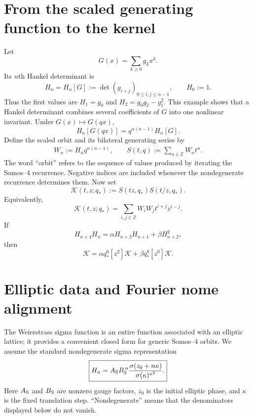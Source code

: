 \documentclass[11pt]{article}
\numberwithin{equation}{section}
\begin{document}
\section{From the scaled generating function to the kernel}
Let
\begin{equation}
G(x)=\sum_{k\ge0}g_kx^k.
\end{equation}
Its $n$th Hankel determinant is
\begin{equation}
H_n=H_n[G]:=\det(g_{i+j})_{0\le i,j\le n-1},\qquad H_0:=1.
\end{equation}
Thus the first values are $H_1=g_0$ and $H_2=g_0g_2-g_1^2$.  This example shows that a Hankel determinant combines several coefficients of $G$ into one nonlinear invariant. Under $G(x)\mapsto G(qx)$,
\begin{equation}
H_n[G(qx)]=q^{n(n-1)}H_n[G].
\end{equation}
Define the scaled orbit and its bilateral generating series by
\begin{equation}
\begin{aligned}
W_n:=H_nq^{n(n-1)},\qquad
S(t,q):=\sum_{n\in\mathbb Z}W_nt^n.
\end{aligned}
\end{equation}
The word ``orbit'' refers to the sequence of values produced by iterating the Somos--4 recurrence.  Negative indices are included whenever the nondegenerate recurrence determines them.  Now set
\begin{equation}
\boxed{\mathcal K(t,z;q_\ast):=S(tz,q_\ast)S(t/z,q_\ast).}
\end{equation}
Equivalently,
\begin{equation}
\mathcal K(t,z;q_\ast)=\sum_{i,j\in\mathbb Z}W_iW_jt^{i+j}z^{i-j}.
\end{equation}
If
\begin{equation}
H_{n+4}H_n=\alpha H_{n+3}H_{n+1}+\beta H_{n+2}^2,
\end{equation}
then
\begin{equation}
[z^4]\mathcal K=\alpha q_\ast^6[z^2]\mathcal K+\beta q_\ast^8[z^0]\mathcal K.
\end{equation}

\section{Elliptic data and Fourier nome alignment}
The Weierstrass sigma function is an entire function associated with an elliptic lattice; it provides a convenient closed form for generic Somos--4 orbits.  We assume the standard nondegenerate sigma representation
\begin{equation}
\boxed{H_n=A_{\rm S}B_{\rm S}^{\,n}
\frac{\sigma(z_0+n\kappa)}{\sigma(\kappa)^{n^2}}.}
\end{equation}
Here $A_{\rm S}$ and $B_{\rm S}$ are nonzero gauge factors, $z_0$ is the initial elliptic phase, and $\kappa$ is the fixed translation step.  ``Nondegenerate'' means that the denominators displayed below do not vanish.
\end{document}
